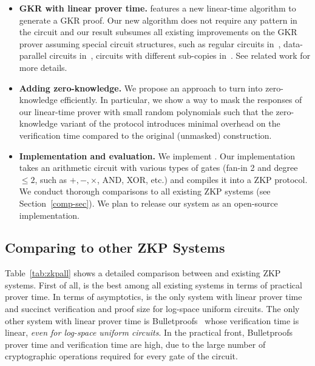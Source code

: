 \begin{itemize}[leftmargin=*]
	\item \textbf{GKR with linear prover time.} \name features a new linear-time algorithm to generate a GKR proof. Our new algorithm does not require any pattern in the circuit and our result subsumes all existing improvements on the GKR prover assuming special circuit structures, such as regular circuits in~\cite{JT_Thesis}, data-parallel circuits in~\cite{JT_Thesis,wahby2017full}, circuits with different sub-copies in~\cite{vram}. See related work for more details. 
	\item \textbf{Adding zero-knowledge.} We propose an approach to turn \name into zero-knowledge efficiently. In particular, we show a way to mask the responses of our linear-time prover with small random polynomials such that the zero-knowledge variant of the protocol introduces minimal overhead on the verification time compared to the original (unmasked) construction. 
	\item \textbf{Implementation and evaluation.}  We implement \name. Our implementation takes an arithmetic circuit with various types of gates (fan-in 2 and degree $\le 2$, such as $+,-,\times$, AND, XOR, etc.) and compiles it into a ZKP protocol. We conduct thorough comparisons to all existing ZKP systems (see Section~\ref{comp-sec}). We plan to release our system as an open-source implementation.

\end{itemize}

\subsection{Comparing to other ZKP Systems\label{comp-sec}} Table~\ref{tab:zkpall} shows a detailed comparison between \name and existing ZKP systems. First of all, \name is the best among all existing systems in terms of practical prover time. In terms of asymptotics, \name is the only system with linear prover time and succinct verification and proof size for log-space uniform circuits.
The only other system with linear prover time is \textsf{Bulletproofs}~\cite{bulletproofs} whose verification time is linear, \emph{even for log-space uniform circuits}. In the practical front, \textsf{Bulletproofs} prover time and verification time are high, due to the large number of cryptographic operations required for every gate of the circuit. 

